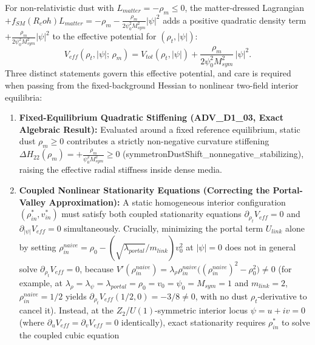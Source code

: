 \documentclass[american,11pt,letterpaper]{article}
\newcommand{\Rcoh}{R_{\mathrm{coh}}}
\def\mathbb#1{#1}%
\def\mathcal#1{#1}%
\def\mathrm#1{#1}%
\def\texttt#1{#1}%
\def\emph#1{#1}%
\def\Rcoh{R_coh}%
\begin{document}
For non-relativistic dust with $\mathcal{L}_{\mathrm{matter}} = -\rho_m \le 0$, the matter-dressed Lagrangian $+f_{\mathrm{SM}}(\Rcoh)\mathcal{L}_{\mathrm{matter}} = -\rho_m - \frac{\rho_m}{2\psi_0^2 M_{\mathrm{sym}}^2}|\psi|^2$ adds a positive quadratic density term $+\frac{\rho_m}{2\psi_0^2 M_{\mathrm{sym}}^2}|\psi|^2$ to the effective potential for $(\rho_t, |\psi|)$:
\begin{equation}
V_{\mathrm{eff}}(\rho_t, |\psi|;\,\rho_m)
= V_{\mathrm{tot}}(\rho_t, |\psi|) + \frac{\rho_m}{2\psi_0^2 M_{\mathrm{sym}}^2}\,|\psi|^2.
\label{eq:symmetron_Veff_sec6}
\end{equation}
Three distinct statements govern this effective potential, and care is required when passing from the fixed-background Hessian to nonlinear two-field interior equilibria:
\begin{enumerate}[leftmargin=2em]
  \item \textbf{Fixed-Equilibrium Quadratic Stiffening (\texttt{ADV\_D1\_03}, Exact Algebraic Result):} Evaluated around a fixed reference equilibrium, static dust $\rho_m \ge 0$ contributes a strictly non-negative curvature stiffening $\Delta H_{22}(\rho_m) = +\frac{\rho_m}{\psi_0^2 M_{\mathrm{sym}}^2} \ge 0$ (\texttt{symmetronDustShift\_nonnegative\_stabilizing}), raising the effective radial stiffness inside dense media.
  \item \textbf{Coupled Nonlinear Stationarity Equations (Correcting the Portal-Valley Approximation):} A static homogeneous interior configuration $(\rho_{\mathrm{in}}^*, v_{\mathrm{in}}^*)$ must satisfy \emph{both} coupled stationarity equations $\partial_{\rho_t} V_{\mathrm{eff}} = 0$ and $\partial_{|\psi|} V_{\mathrm{eff}} = 0$ simultaneously. Crucially, minimizing the portal term $U_{\mathrm{link}}$ alone by setting $\rho_{\mathrm{in}}^{\mathrm{naive}} = \rho_0 - (\sqrt{\lambda_{\mathrm{portal}}}/m_{\mathrm{link}})v_0^2$ at $|\psi| = 0$ does \emph{not} in general solve $\partial_{\rho_t} V_{\mathrm{eff}} = 0$, because $V'(\rho_{\mathrm{in}}^{\mathrm{naive}}) = \lambda_\rho\rho_{\mathrm{in}}^{\mathrm{naive}}\bigl((\rho_{\mathrm{in}}^{\mathrm{naive}})^2 - \rho_0^2\bigr) \ne 0$ (for example, at $\lambda_\rho = \lambda_\psi = \lambda_{\mathrm{portal}} = \rho_0 = v_0 = \psi_0 = M_{\mathrm{sym}} = 1$ and $m_{\mathrm{link}} = 2$, $\rho_{\mathrm{in}}^{\mathrm{naive}} = 1/2$ yields $\partial_{\rho_t} V_{\mathrm{eff}}(1/2, 0) = -3/8 \ne 0$, with no dust $\rho_t$-derivative to cancel it). Instead, at the $\mathbb{Z}_2$/$U(1)$-symmetric interior locus $\psi = u + iv = 0$ (where $\partial_u V_{\mathrm{eff}} = \partial_v V_{\mathrm{eff}} = 0$ identically), exact stationarity requires $\rho_{\mathrm{in}}^*$ to solve the coupled cubic equation

\end{enumerate}
\end{document}
